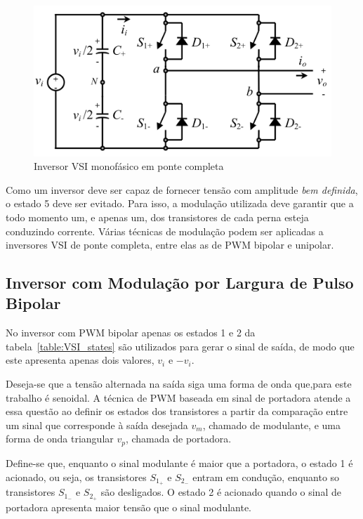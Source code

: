 \documentclass[
	12pt,				%
	openany,
	onseside,
	a4paper,			%
	english,			%
	french,				%
	spanish,			%
	brazil,				%
	]{abntex2}
\begin{document}
\begin{figure}[htbp]
	\begin{center}
		\includegraphics[width=0.65 \linewidth]{vsi_1fas}
		\caption{Inversor VSI monofásico em ponte completa \cite{RASHID_VSI}}
		\label{fig:vsi_1fas}
	\end{center}
\end{figure}

Como um inversor deve ser capaz de fornecer tensão com amplitude \emph{bem definida}, o estado 5 deve ser evitado. Para isso, a modulação utilizada deve garantir que a todo momento um, e apenas um, dos transistores de cada perna esteja conduzindo corrente. Várias técnicas de modulação podem ser aplicadas a inversores VSI de ponte completa, entre elas as de PWM bipolar e unipolar\cite{RASHID_VSI}.

\subsection{Inversor com Modulação por Largura de Pulso Bipolar}

No inversor com PWM bipolar apenas os estados 1 e 2 da tabela~\ref{table:VSI_states} são utilizados para gerar o sinal de saída, de modo que este apresenta apenas dois valores, $v_i$ e $-v_i$.

Deseja-se que a tensão alternada na saída siga uma forma de onda que,para este trabalho é senoidal. A técnica de PWM baseada em sinal de portadora atende a essa questão ao definir os estados dos transistores a partir da comparação entre um sinal que corresponde à saída desejada $v_m$, chamado de modulante, e uma forma de onda triangular $v_p$, chamada de portadora.

Define-se que, enquanto o sinal modulante é maior que a portadora, o estado 1 é acionado, ou seja, os transistores $S_{1_+}$ e $S_{2_-}$ entram em condução, enquanto so transistores $S_{1_-}$ e $S_{2_+}$ são desligados. O estado 2 é acionado quando o sinal de portadora apresenta maior tensão que o sinal modulante. 
\end{document}
